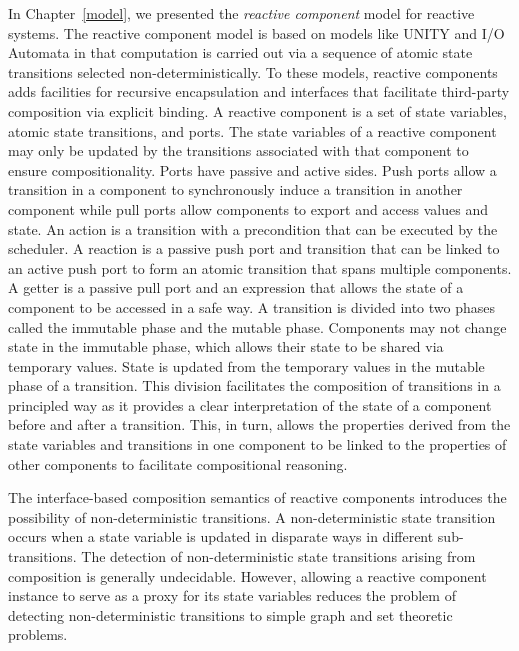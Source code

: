In Chapter~\ref{model}, we presented the \emph{reactive component} model for reactive systems.
The reactive component model is based on models like UNITY and I/O Automata in that computation is carried out via a sequence of atomic state transitions selected non-deterministically.
To these models, reactive components adds facilities for recursive encapsulation and interfaces that facilitate third-party composition via explicit binding.
A reactive component is a set of state variables, atomic state transitions, and ports.
The state variables of a reactive component may only be updated by the transitions associated with that component to ensure compositionality.
Ports have passive and active sides.
Push ports allow a transition in a component to synchronously induce a transition in another component while pull ports allow components to export and access values and state.
An action is a transition with a precondition that can be executed by the scheduler.
A reaction is a passive push port and transition that can be linked to an active push port to form an atomic transition that spans multiple components.
A getter is a passive pull port and an expression that allows the state of a component to be accessed in a safe way.
A transition is divided into two phases called the immutable phase and the mutable phase.
Components may not change state in the immutable phase, which allows their state to be shared via temporary values.
State is updated from the temporary values in the mutable phase of a transition.
This division facilitates the composition of transitions in a principled way as it provides a clear interpretation of the state of a component before and after a transition.
This, in turn, allows the properties derived from the state variables and transitions in one component to be linked to the properties of other components to facilitate compositional reasoning.

The interface-based composition semantics of reactive components introduces the possibility of non-deterministic transitions.
A non-deterministic state transition occurs when a state variable is updated in disparate ways in different sub-transitions.
The detection of non-deterministic state transitions arising from composition is generally undecidable.
However, allowing a reactive component instance to serve as a proxy for its state variables reduces the problem of detecting non-deterministic transitions to simple graph and set theoretic problems.

